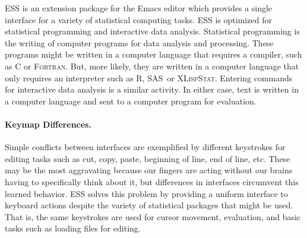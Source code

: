 \documentclass{article}
\newcommand*{\SAS}{\textsc{SAS}}
\newcommand*{\XLispStat}{\textsc{XLispStat}}
\newcommand*{\Fortran}{\textsc{Fortran}}
\newcommand{\stexttt}[1]{{\small\texttt{#1}}}
\begin{document}

ESS is an extension package for the Emacs editor which provides a
single interface for a variety of statistical computing tasks.  ESS is
optimized for statistical programming and interactive data analysis.
Statistical programming is the writing of computer programs for data
analysis and processing.  These programs might be written in a
computer language that requires a compiler, such as C or \Fortran.
But, more likely, they are written in a computer language that only
requires an interpreter such as R, \SAS\ or \XLispStat.
Entering commands for interactive data analysis is a similar activity.
In either case, text is written in a computer language and sent to a
computer program for evaluation.

\paragraph{Keymap Differences.} %
\label{sec:confl-keym}

Simple conflicts between interfaces are exemplified by different
keystrokes for editing tasks such as cut, copy, paste, beginning of
line, end of line, etc.  These may be the most aggravating because our
fingers are acting without our brains having to specifically think
about it, but differences in interfaces circumvent this learned
behavior.  ESS solves this problem by providing a uniform interface to
keyboard actions despite the variety of statistical packages that
might be used.  That is, the same keystrokes are used for cursor
movement, evaluation, and basic tasks such as loading files for
editing.
\end{document}
